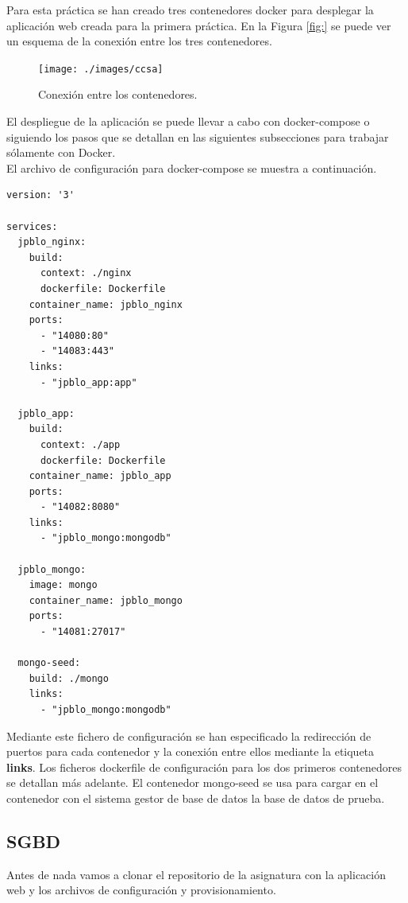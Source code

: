 Para esta práctica se han creado tres contenedores docker para desplegar la aplicación web creada para la primera práctica. En la Figura \ref{fig:} se puede ver un esquema de la conexión entre los tres contenedores. \\

\begin{figure}[h!]
	\centering
	\texttt{[image: ./images/ccsa]}
	\caption{Conexión entre los contenedores.} 
	\label{fig:ccsa}
\end{figure}

El despliegue de la aplicación se puede llevar a cabo con docker-compose o siguiendo los pasos que se detallan en las siguientes subsecciones para trabajar sólamente con Docker. \\

El archivo de configuración para docker-compose se muestra a continuación. \\

\begin{lstlisting}
version: '3'

services:
  jpblo_nginx:
    build:
      context: ./nginx
      dockerfile: Dockerfile
    container_name: jpblo_nginx
    ports:
      - "14080:80"
      - "14083:443"
    links:
      - "jpblo_app:app"

  jpblo_app:
    build:
      context: ./app
      dockerfile: Dockerfile
    container_name: jpblo_app
    ports:
      - "14082:8080"
    links:
      - "jpblo_mongo:mongodb"

  jpblo_mongo:
    image: mongo
    container_name: jpblo_mongo
    ports:
      - "14081:27017"
      
  mongo-seed:
    build: ./mongo
    links:
      - "jpblo_mongo:mongodb"
\end{lstlisting}

Mediante este fichero de configuración se han especificado la redirección de puertos para cada contenedor y la conexión entre ellos mediante la etiqueta \textbf{links}. Los ficheros dockerfile de configuración para los dos primeros contenedores se detallan más adelante. El contenedor mongo-seed se usa para cargar en el contenedor con el sistema gestor de base de datos la base de datos de prueba. \\

\subsection{SGBD}

Antes de nada vamos a clonar el repositorio de la asignatura con la aplicación web y los archivos de configuración y provisionamiento. \\

